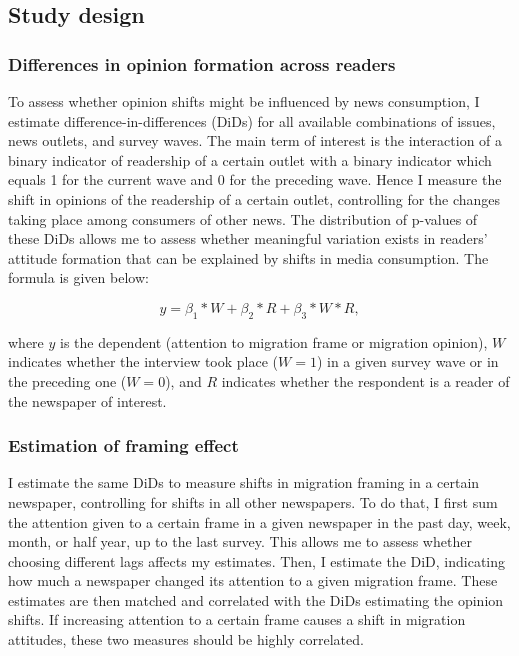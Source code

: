 \documentclass{article}
\begin{document}
\subsection{Study design}

\subsubsection{Differences in opinion formation across readers}

To assess whether opinion shifts might be influenced by news consumption, I estimate difference-in-differences (DiDs) for all available combinations of issues, news outlets, and survey waves. The main term of interest is the interaction of a binary indicator of readership of a certain outlet with a binary indicator which equals 1 for the current wave and 0 for the preceding wave. Hence I measure the shift in opinions of the readership of a certain outlet, controlling for the changes taking place among consumers of other news. The distribution of p-values of these DiDs allows me to assess whether meaningful variation exists in readers' attitude formation that can be explained by shifts in media consumption. The formula is given below:

$$ y = \beta_1 * W + \beta_2 * R + \beta_3 * W * R, $$

where $y$ is the dependent (attention to migration frame or migration opinion), $W$ indicates whether the interview took place ($W = 1$) in a given survey wave or in the preceding one ($W = 0$), and $R$ indicates whether the respondent is a reader of the newspaper of interest.


\subsubsection{Estimation of framing effect}\label{sec:models}

I estimate the same DiDs to measure shifts in migration framing in a certain newspaper, controlling for shifts in all other newspapers. To do that, I first sum the attention given to a certain frame in a given newspaper in the past day, week, month, or half year, up to the last survey. This allows me to assess whether choosing different lags affects my estimates. Then, I estimate the DiD, indicating how much a newspaper changed its attention to a given migration frame. These estimates are then matched and correlated with the DiDs estimating the opinion shifts. If increasing attention to a certain frame causes a shift in migration attitudes, these two measures should be highly correlated.
\end{document}
